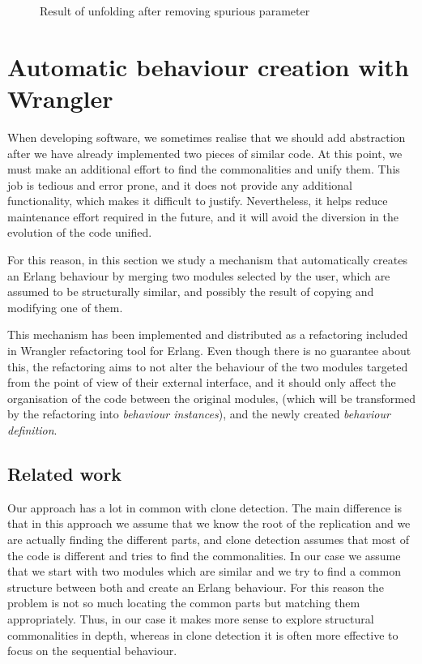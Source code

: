 \begin{figure}


\caption{Result of unfolding after removing spurious parameter\label{fig:final_result}}
\end{figure}

\section{Automatic behaviour creation with Wrangler}

When developing software, we sometimes realise that we should add
abstraction after we have already implemented two pieces of similar
code. At this point, we must make an additional effort to find the
commonalities and unify them. This job is tedious and error prone,
and it does not provide any additional functionality, which makes
it difficult to justify. Nevertheless, it helps reduce maintenance
effort required in the future, and it will avoid the diversion in
the evolution of the code unified.

For this reason, in this section we study a mechanism that automatically
creates an Erlang behaviour by merging two modules selected by the
user, which are assumed to be structurally similar, and possibly the
result of copying and modifying one of them.

This mechanism has been implemented and distributed as a refactoring
included in Wrangler refactoring tool for Erlang. Even though there is no
guarantee about this, the refactoring aims to not alter the behaviour
of the two modules targeted from the point of view of their external
interface, and it should only affect the organisation of the code
between the original modules, (which will be transformed by the refactoring
into \emph{behaviour instances}), and the newly created \emph{behaviour
definition}.


\subsection{Related work}

Our approach has a lot in common with clone detection. The main difference
is that in this approach we assume that we know the root of the replication
and we are actually finding the different parts, and clone detection
assumes that most of the code is different and tries to find the commonalities.
In our case we assume that we start with two modules which are similar
and we try to find a common structure between both and create an Erlang
behaviour. For this reason the problem is not so much locating the
common parts but matching them appropriately. Thus, in our case it
makes more sense to explore structural commonalities in depth, whereas
in clone detection it is often more effective to focus on the sequential
behaviour.


